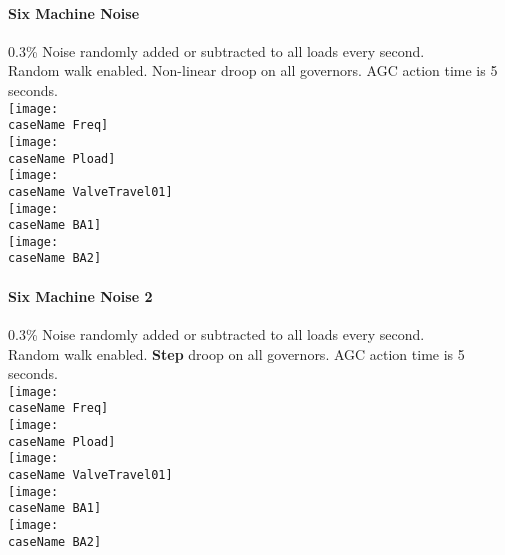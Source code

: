 \documentclass[12pt]{article}
\newcommand{\caseName}{ }
\begin{document}
\renewcommand{\caseName}{SixMachineNoise}
\paragraph{Six Machine Noise} 0.3\% Noise randomly added or subtracted to all loads every second.\\ Random walk enabled. Non-linear droop on all governors. AGC action time is 5 seconds.\\
	\texttt{[image: \\caseName Freq]} \\
	\texttt{[image: \\caseName Pload]} \\
	\texttt{[image: \\caseName ValveTravel01]} \\
	\texttt{[image: \\caseName BA1]}\\
	\texttt{[image: \\caseName BA2]} 	
\pagebreak

\begin{comment}

\renewcommand{\caseName}{SixMachineNoise3}
\paragraph{Six Machine Noise 3} 0.3\% Noise randomly added or subtracted to all loads every second.\\ Random walk enabled. Non-Linear droop on all governors. AGC action time is \textbf{10 seconds}.\\
	\texttt{[image: \\caseName Freq]} \\
	\texttt{[image: \\caseName Pload]} \\
	\texttt{[image: \\caseName ValveTravel01]} \\
	\texttt{[image: \\caseName BA1]}\\
	\texttt{[image: \\caseName BA2]} 
\pagebreak

\end{comment}
\renewcommand{\caseName}{SixMachineNoise2}
\paragraph{Six Machine Noise 2} 0.3\% Noise randomly added or subtracted to all loads every second.\\ Random walk enabled. \textbf{Step} droop on all governors. AGC action time is 5 seconds.\\
	\texttt{[image: \\caseName Freq]} \\
	\texttt{[image: \\caseName Pload]} \\
	\texttt{[image: \\caseName ValveTravel01]} \\
	\texttt{[image: \\caseName BA1]}\\
	\texttt{[image: \\caseName BA2]} 
\pagebreak
\end{document}

